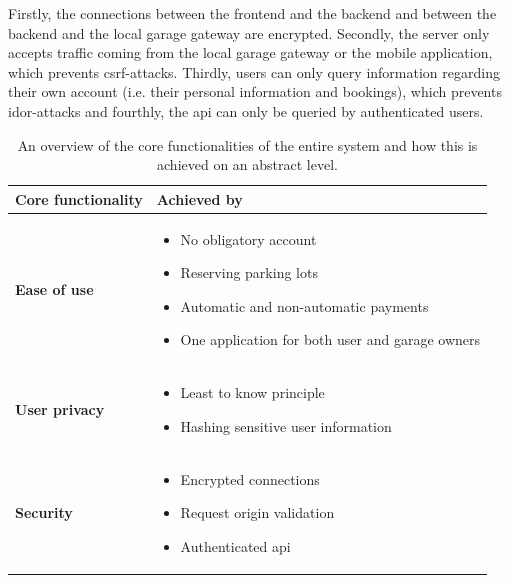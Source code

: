 \ind Firstly, the connections between the frontend and the backend and between the backend and the local garage gateway are encrypted. Secondly, the server only accepts traffic coming from the local garage gateway or the mobile application, which prevents \ac{csrf}-attacks. Thirdly, users can only query information regarding their own account (i.e. their personal information and bookings), which prevents \ac{idor}-attacks and fourthly, the \ac{api} can only be queried by authenticated users.

\begin{table}[htp]
    \centering
    \caption{An overview of the core functionalities of the entire system and how this is achieved on an abstract level.}
    \begin{tabular}{|>{\bfseries\centering\arraybackslash}m{1in}|>{\centering\arraybackslash}m{8cm}|}
         \hline
         \textbf{Core functionality} & \textbf{Achieved by}  \\
         \hline
         \hline
         Ease of use & \begin{itemize}[left=0pt]
             \item No obligatory account
             \item Reserving parking lots
             \item Automatic and non-automatic payments
             \item One application for both user and garage owners
         \end{itemize} \\
         \hline
         User privacy & \begin{itemize}[left=0pt]
             \item Least to know principle
             \item Hashing sensitive user information
         \end{itemize}\\
         \hline
         Security &\begin{itemize}[left=0pt]
             \item Encrypted connections
             \item Request origin validation
             \item Authenticated \ac{api}
         \end{itemize} \\
         \hline
    \end{tabular}
    \label{tab:core-functionalities}
\end{table}
